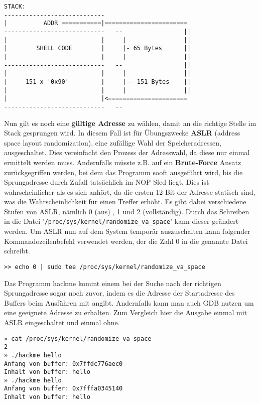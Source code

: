 \documentclass[12pt]{article}
\begin{document}
\begin{lstlisting}
STACK:
----------------------------
|          ADDR ===========|=======================
----------------------------   --                 ||
|                          |     |                ||
|        SHELL CODE        |     |- 65 Bytes      ||
|                          |     |                ||
----------------------------   --                 ||
|                          |     |                ||
|     151 x '0x90'         |     |-- 151 Bytes    ||
|                          |     |                ||
|                          |<======================
----------------------------   --
\end{lstlisting}


Nun gilt es noch eine \textbf{gültige Adresse} zu wählen, damit an die richtige Stelle im Stack gesprungen wird. In diesem Fall ist für Übungszwecke \textbf{ASLR} (address space layout randomization), eine zufällige Wahl der Speicheradressen, ausgeschaltet. Dies vereinfacht den Prozess der Adresswahl, da diese nur einmal ermittelt werden muss. Andernfalls müsste z.B. auf ein \textbf{Brute-Force} Ansatz zurückgegriffen werden, bei dem das Programm sooft ausgeführt wird, bis die Sprungadresse durch Zufall tatsächlich im NOP Sled liegt. Dies ist wahrscheinlicher als es sich anhört, da die ersten 12 Bit der Adresse statisch sind, was die Wahrscheinlichkeit für einen Treffer erhöht.
\newline
\newline
Es gibt dabei verschiedene Stufen von ASLR, nämlich 0 (aus) , 1 und 2 (vollständig). Durch das Schreiben in die Datei '\texttt{/proc/sys/kernel/randomize\_va\_space}' kann dieser geändert werden.
Um ASLR nun auf dem System temporär auszuschalten kann folgender Kommandozeilenbefehl verwendet werden, der die Zahl 0 in die genannte Datei schreibt.

\begin{lstlisting}
>> echo 0 | sudo tee /proc/sys/kernel/randomize_va_space
\end{lstlisting}
Das Programm hackme kommt einem bei der Suche nach der richtigen Sprungadresse sogar noch zuvor, indem es die Adresse der Startadresse des Buffers beim Ausführen mit angibt. Andernfalls kann man auch GDB nutzen um eine geeignete Adresse zu erhalten.
\newline
\newline
Zum Vergleich hier die Ausgabe einmal mit ASLR eingeschaltet und einmal ohne.
\begin{lstlisting}[caption={ASLR enabled}, captionpos=t]
» cat /proc/sys/kernel/randomize_va_space     
2
» ./hackme hello                              
Anfang von buffer: 0x7ffdc776aec0
Inhalt von buffer: hello
» ./hackme hello                              
Anfang von buffer: 0x7fffa0345140
Inhalt von buffer: hello
\end{lstlisting}
\end{document}
